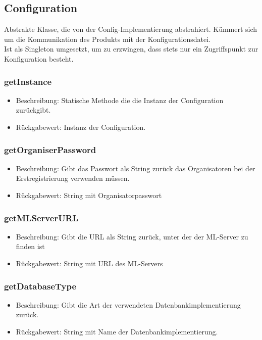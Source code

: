 \documentclass[a4paper]{scrreprt}
\begin{document}
    \subsection{Configuration}
    Abstrakte Klasse, die von der Config-Implementierung abstrahiert.
    Kümmert sich um die Kommunikation des Produkts mit der Konfigurationsdatei. \\
    Ist als Singleton umgesetzt, um zu erzwingen, dass stets nur ein Zugriffspunkt zur Konfiguration besteht.

    \subsubsection{getInstance}
    \begin{itemize}
        \item Beschreibung: Statische Methode die die Instanz der Configuration zurückgibt.
        \item Rückgabewert: Instanz der Configuration.
    \end{itemize}


    \subsubsection{getOrganiserPassword}
    \begin{itemize}
        \item Beschreibung: Gibt das Passwort als String zurück das Organisatoren bei der Erstregistrierung verwenden müssen.
        \item Rückgabewert: String mit Organisatorpasswort
    \end{itemize}

    \subsubsection{getMLServerURL}
    \begin{itemize}
        \item Beschreibung: Gibt die URL als String zurück, unter der der ML-Server zu finden ist
        \item Rückgabewert: String mit URL des ML-Servers
    \end{itemize}

    \subsubsection{getDatabaseType}
    \begin{itemize}
        \item Beschreibung: Gibt die Art der verwendeten Datenbankimplementierung zurück.
        \item Rückgabewert: String mit Name der Datenbankimplementierung.
    \end{itemize}
\end{document}
